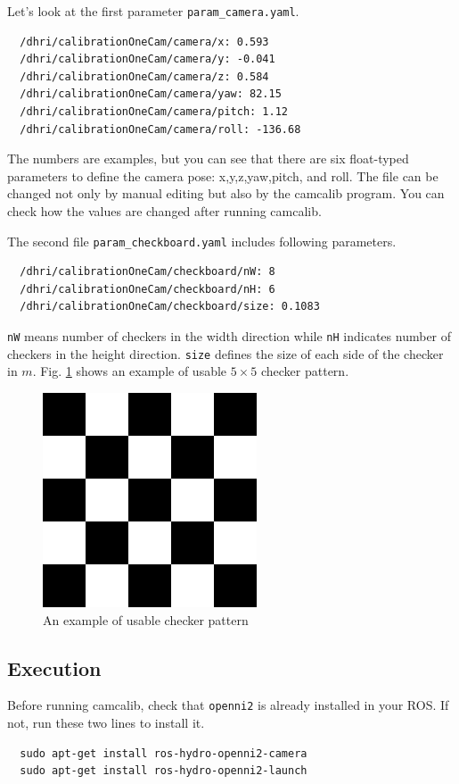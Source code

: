 \documentclass[a4paper,twoside, openright,12pt]{report}
\begin{document}
Let's look at the first parameter \verb|param_camera.yaml|.
\begin{verbatim}
  /dhri/calibrationOneCam/camera/x: 0.593
  /dhri/calibrationOneCam/camera/y: -0.041
  /dhri/calibrationOneCam/camera/z: 0.584
  /dhri/calibrationOneCam/camera/yaw: 82.15
  /dhri/calibrationOneCam/camera/pitch: 1.12
  /dhri/calibrationOneCam/camera/roll: -136.68
\end{verbatim}

The numbers are examples, but you can see that there are six float-typed parameters to define the camera pose: x,y,z,yaw,pitch, and roll. 
The file can be changed not only by manual editing but also by the camcalib program. You can check how the values are changed after running camcalib.

The second file \verb|param_checkboard.yaml| includes following parameters.
\begin{verbatim}
  /dhri/calibrationOneCam/checkboard/nW: 8
  /dhri/calibrationOneCam/checkboard/nH: 6
  /dhri/calibrationOneCam/checkboard/size: 0.1083
\end{verbatim}

\verb|nW| means number of checkers in the width direction while \verb|nH| indicates number of checkers in the height direction. \verb|size| defines the size of each side of the checker in $m$.
Fig. \ref{fig:checker} shows an example of usable $5 \times 5$ checker pattern.
\begin{figure}[b]
	\centering
	\includegraphics[width=0.25\linewidth]{fig/checker.png}
	\caption{An example of usable checker pattern}
	\label{fig:checker}
\end{figure}

\subsection{Execution}

Before running camcalib, check that \verb|openni2| is already installed in your ROS. If not, run these two lines to install it. 

\begin{verbatim}
  sudo apt-get install ros-hydro-openni2-camera
  sudo apt-get install ros-hydro-openni2-launch
\end{verbatim}
\end{document}
